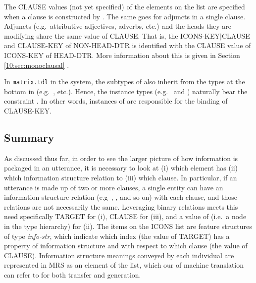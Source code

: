 
\noindent The CLAUSE values (not yet specified) of the elements on the
 list are specified when a clause is constructed by
. The same goes for adjuncts in a
single clause.  Adjuncts (e.g.\ attributive adjectives, adverbs, etc.)
and the heads they are modifying share the same value of
CLAUSE. That is, the ICONS-KEY{$\mid$}CLAUSE
and CLAUSE-KEY of NON-HEAD-DTR is identified with the CLAUSE value of
ICONS-KEY of HEAD-DTR. More information about this is given in
Section \ref{10:sec:monoclausal}
.





In \texttt{matrix.tdl} in the \lingo {} system, the
subtypes of  also inherit from the types at the
bottom in  (e.g.\ ,
etc.). Hence, the instance types (e.g.\ 
and ) naturally bear the constraint
. In other words, instances of
 are responsible for the binding of CLAUSE-KEY.




\subsection{Summary}
\label{9:ssec:icons-summary}

As discussed thus far, in order to see the larger picture of how
information is packaged in an utterance, it is necessary to look at
(i) which element has (ii) which information structure relation to
(iii) which clause. In particular, if an utterance is made up of two
or more clauses, a single entity can have an information structure
relation (e.g\ , , and so on) with each clause, and those
relations are not necessarily the
same. Leveraging binary
relations meets this need specifically TARGET for (i), CLAUSE for
(iii), and a value of  (i.e.\ a
node in the type hierarchy) for (ii). The items on the ICONS list are
feature structures of type \textit{info-str}, which indicate which
index (the value of TARGET) has a property of information structure
and with respect to which clause (the value of CLAUSE).  Information
structure meanings conveyed by each individual are represented in MRS
as an element of the  list, which our
 of machine translation can refer to for both
transfer and generation.


